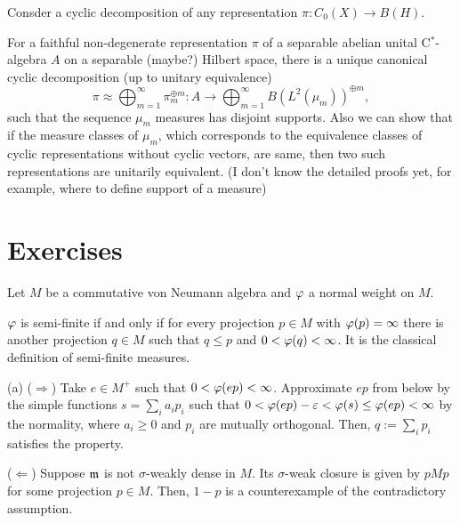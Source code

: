\documentclass{../../large}
\begin{document}
\begin{prb}
Consder a cyclic decomposition of any representation $\pi:C_0(X)\to B(H)$.

For a faithful non-degenerate representation $\pi$ of a separable abelian unital C$^*$-algebra $A$ on a separable (maybe?) Hilbert space, there is a unique canonical cyclic decomposition (up to unitary equivalence)
\[\pi\approx\bigoplus_{m=1}^\infty\pi_m^{\oplus m}:A\to\bigoplus_{m=1}^\infty B(L^2(\mu_m))^{\oplus m},\]
such that the sequence $\mu_m$ measures has disjoint supports.
Also we can show that if the measure classes of $\mu_m$, which corresponds to the equivalence classes of cyclic representations without cyclic vectors, are same, then two such representations are unitarily equivalent.
(I don't know the detailed proofs yet, for example, where to define support of a measure)
\end{prb}





\section*{Exercises}


\begin{prb}
Let $M$ be a commutative von Neumann algebra and $\varphi$ a normal weight on $M$.
\begin{parts}
\item $\varphi$ is semi-finite if and only if for every projection $p\in M$ with $\varphi(p)=\infty$ there is another projection $q\in M$ such that $q\le p$ and $0<\varphi(q)<\infty$.
It is the classical definition of semi-finite measures.
\end{parts}
\end{prb}
\begin{pf}
(a)
($\Rightarrow$)
Take $e\in M^+$ such that $0<\varphi(ep)<\infty$.
Approximate $ep$ from below by the simple functions $s=\sum_ia_ip_i$ such that $0<\varphi(ep)-\varepsilon<\varphi(s)\le\varphi(ep)<\infty$ by the normality, where $a_i\ge0$ and $p_i$ are mutually orthogonal.
Then, $q:=\sum_ip_i$ satisfies the property.

($\Leftarrow$)
Suppose $\mathfrak{m}$ is not $\sigma$-weakly dense in $M$.
Its $\sigma$-weak closure is given by $pMp$ for some projection $p\in M$.
Then, $1-p$ is a counterexample of the contradictory assumption.
\end{pf}
\end{document}
